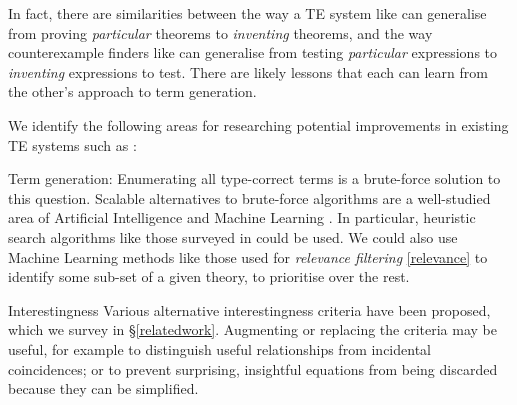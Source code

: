 In fact, there are similarities between the way a TE system like \hspec{} can generalise from proving \emph{particular} theorems to \emph{inventing} theorems, and the way counterexample finders like \qcheck{} can generalise from testing \emph{particular} expressions to \emph{inventing} expressions to test. There are likely lessons that each can learn from the other's approach to term generation.

We identify the following areas for researching potential improvements in existing TE systems such as \hspec{}:

\begin{description}
\item{Term generation}:
  Enumerating all type-correct terms is a brute-force solution to this question. Scalable alternatives to brute-force algorithms are a well-studied area of Artificial Intelligence and Machine Learning \iffalse TODO{2015-11-15}: Related work reference \fi. In particular, heuristic search algorithms like those surveyed in \citep{blum2011hybrid} could be used.
  We could also use Machine Learning methods like those used for \emph{relevance filtering} \ref{relevance} to identify some sub-set of a given theory, to prioritise over the rest.

\item{Interestingness}
  Various alternative interestingness criteria have been proposed, which we survey in \S \ref{relatedwork}. Augmenting or replacing the criteria may be useful, for example to distinguish useful relationships from incidental coincidences; or to prevent surprising, insightful equations from being discarded because they can be simplified.
\end{description}





